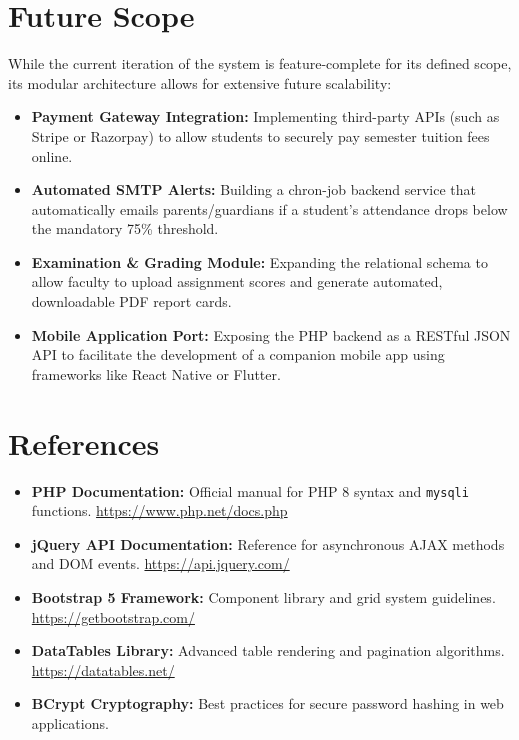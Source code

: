 \documentclass[12pt, a4paper]{report}
\begin{document}
\chapter{Future Scope}
While the current iteration of the system is feature-complete for its defined scope, its modular architecture allows for extensive future scalability:
\begin{itemize}
    \item \textbf{Payment Gateway Integration:} Implementing third-party APIs (such as Stripe or Razorpay) to allow students to securely pay semester tuition fees online.
    \item \textbf{Automated SMTP Alerts:} Building a chron-job backend service that automatically emails parents/guardians if a student's attendance drops below the mandatory 75\% threshold.
    \item \textbf{Examination \& Grading Module:} Expanding the relational schema to allow faculty to upload assignment scores and generate automated, downloadable PDF report cards.
    \item \textbf{Mobile Application Port:} Exposing the PHP backend as a RESTful JSON API to facilitate the development of a companion mobile app using frameworks like React Native or Flutter.
\end{itemize}

\chapter{References}
\begin{itemize}
    \item \textbf{PHP Documentation:} Official manual for PHP 8 syntax and \texttt{mysqli} functions. \url{https://www.php.net/docs.php}
    \item \textbf{jQuery API Documentation:} Reference for asynchronous AJAX methods and DOM events. \url{https://api.jquery.com/}
    \item \textbf{Bootstrap 5 Framework:} Component library and grid system guidelines. \url{https://getbootstrap.com/}
    \item \textbf{DataTables Library:} Advanced table rendering and pagination algorithms. \url{https://datatables.net/}
    \item \textbf{BCrypt Cryptography:} Best practices for secure password hashing in web applications.
\end{itemize}
\end{document}
